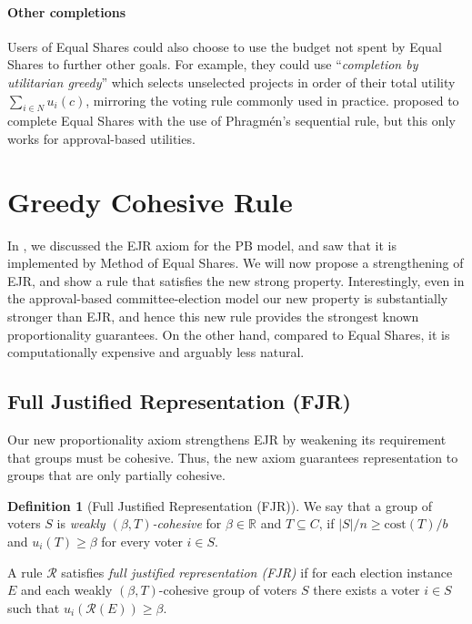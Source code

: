 \documentclass[10pt]{scrartcl}
\renewcommand*{\geq}{\geqslant}
\newcommand{\reals}{{{\mathbb{R}}}}
\newcommand{\cost}{{{\mathrm{cost}}}}
\newcommand{\calR}{{{\mathcal{R}}}}
\theoremstyle{definition}
\newtheorem{definition}{Definition}
\theoremstyle{plain}
\begin{document}
\paragraph{Other completions}
Users of Equal Shares could also choose to use the budget not spent by Equal Shares to further other goals. For example, they could use ``\emph{completion by utilitarian greedy}'' which selects unselected projects in order of their total utility $\sum_{i \in N} u_i(c)$, mirroring the voting rule commonly used in practice. \citet{pet-sko:laminar} proposed to complete Equal Shares with the use of  Phragm\'{e}n's sequential rule, but this only works for approval-based utilities.



\section{Greedy Cohesive Rule}

In , we discussed the EJR axiom for the PB model, and saw that it is implemented by Method of Equal Shares. 
We will now propose a strengthening of EJR, and show a rule that satisfies the new strong property. Interestingly, even in the approval-based committee-election model our new property is substantially stronger than EJR, and hence this new rule provides the strongest known proportionality guarantees. On the other hand, compared to Equal Shares, it is computationally expensive and arguably less natural.

\subsection{Full Justified Representation (FJR)}\label{sec:strong_ejr}

Our new proportionality axiom strengthens EJR by weakening its requirement that groups must be cohesive. Thus, the new axiom guarantees representation to groups that are only partially cohesive.

\begin{definition}[Full Justified Representation (FJR)]\label{def:ejr_generalization_strong}
We say that a group of voters $S$ is \emph{weakly $(\beta, T)$-cohesive} for $\beta\in \reals$ and $T \subseteq C$, if $|S|/n \geq \cost(T)/b$ and $u_i(T) \geq \beta$ for every voter $i\in S$.

A rule $\calR$ satisfies \emph{full justified representation (FJR)} if for each election instance $E$ and each weakly $(\beta, T)$-cohesive group of voters $S$ there exists a voter $i \in S$ such that $u_i(\calR(E))\geq \beta$.
\end{definition}
\end{document}
